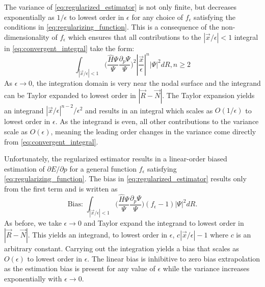 \documentclass[twocolumn]{revtex4-1}
\begin{document}
The variance of \eqref{eq:regularized_estimator} is not only finite, but decreases exponentially as $1/\epsilon$ to lowest order in $\epsilon$ for any choice of $f_\epsilon$ satisfying the conditions in \eqref{eq:regularizing_function}.
This is a consequence of the non-dimensionality of $f_\epsilon$ which ensures that all contributions to the $|\vec{x}/\epsilon|< 1$ integral in \eqref{eq:convergent_integral} take the form:
\begin{equation}
\int_{|\vec{x}/\epsilon|< 1} \Big(\frac{\hat{H}\Psi}{\Psi}\frac{\partial_p\Psi}{\Psi}\Big)^2 |\frac{\vec{x}}{\epsilon}|^n |\Psi|^2 dR, n\geq 2
\end{equation}
As $\epsilon \rightarrow 0$, the integration domain is very near the nodal surface and the integrand can be Taylor expanded to lowest order in $|\vec{R}-\vec{N}|$. 
The Taylor expansion yields an integrand $|\vec{x}/\epsilon|^{n-2}/\epsilon^2$ and results in an integral which scales as $O(1/\epsilon)$ to lowest order in $\epsilon$.
As the integrand is even, all other contributions to the variance scale as $O(\epsilon)$, meaning the leading order changes in the variance come directly from \eqref{eq:convergent_integral}.

Unfortunately, the regularized estimator results in a linear-order biased estimation of $\partial E/\partial p$ for a general function $f_\epsilon$ satisfying \eqref{eq:regularizing_function}.
The bias in \eqref{eq:regularized_estimator} results only from the first term and is written as 
\begin{equation}
\text{Bias: } \int_{|\vec{x}/\epsilon|< 1} \Big(\frac{\hat{H}\Psi}{\Psi}\frac{\partial_p\Psi}{\Psi}\Big) (f_\epsilon - 1)|\Psi|^2 dR.
\label{eq:estimator_bias}
\end{equation}
As before, we take $\epsilon \rightarrow 0$ and Taylor expand the integrand to lowest order in $|\vec{R}-\vec{N}|$.
This yields an integrand, to lowest order in $\epsilon$, $c|\vec{x}/\epsilon| - 1$ where $c$ is an arbitrary constant.
Carrying out the integration yields a bias that scales as $O(\epsilon)$ to lowest order in $\epsilon$.
The linear bias is inhibitive to zero bias extrapolation as the estimation bias is present for any value of $\epsilon$ while the variance increases exponentially with $\epsilon \rightarrow 0$.
\end{document}
